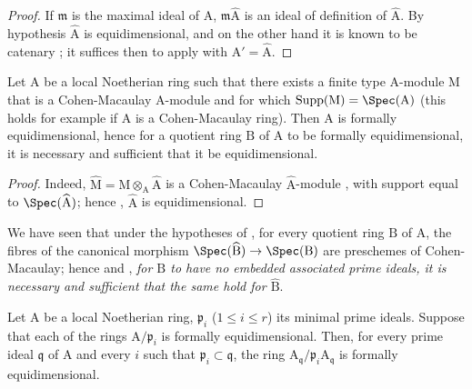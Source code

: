 \begin{proof}
If $\mathfrak{m}$ is the maximal ideal of $\mathrm{A}$, $\mathfrak{m}\widehat{\mathrm{A}}$ is an ideal of definition of $\widehat{\mathrm{A}}$.
By hypothesis $\widehat{\mathrm{A}}$ is equidimensional, and on the other hand it is known to be catenary ; it suffices then to apply  with $\mathrm{A}'=\widehat{\mathrm{A}}$.
\end{proof}

\begin{corollary}[7.1.5]
\label{IV.7.1.5}
Let $\mathrm{A}$ be a local Noetherian ring such that there exists a finite type $\mathrm{A}$-module $\mathrm{M}$ that is a Cohen-Macaulay $\mathrm{A}$-module and for which $\operatorname{Supp}(\mathrm{M})=\Spec(\mathrm{A})$ (this holds for example if $\mathrm{A}$ is a Cohen-Macaulay ring).
Then $\mathrm{A}$ is formally equidimensional, hence  for a quotient ring $\mathrm{B}$ of $\mathrm{A}$ to be formally equidimensional, it is necessary and sufficient that it be equidimensional.
\end{corollary}

\begin{proof}
Indeed, $\widehat{\mathrm{M}}=\mathrm{M}\otimes_\mathrm{A}\widehat{\mathrm{A}}$ is a Cohen-Macaulay $\widehat{\mathrm{A}}$-module , with support equal to $\Spec(\widehat{\mathrm{A}})$; hence , $\widehat{\mathrm{A}}$ is equidimensional.
\end{proof}

\begin{remark}[7.1.6]
\label{IV.7.1.6}
We have seen  that under the hypotheses of , for every quotient ring $\mathrm{B}$ of $\mathrm{A}$, the fibres of the canonical morphism $\Spec(\widehat{\mathrm{B}})\to\Spec(\mathrm{B})$ are preschemes of Cohen-Macaulay; hence  and , \emph{for $\mathrm{B}$ to have no embedded associated prime ideals, it is necessary and sufficient that the same hold for $\widehat{\mathrm{B}}$}.
\end{remark}

\begin{lemma}[7.1.7]
\label{IV.7.1.7}
Let $\mathrm{A}$ be a local Noetherian ring, $\mathfrak{p}_i$ ($1\leqslant i\leqslant r$) its minimal prime ideals.
Suppose that each of the rings $\mathrm{A}/\mathfrak{p}_i$ is formally equidimensional.
Then, for every prime ideal $\mathfrak{q}$ of $\mathrm{A}$ and every $i$ such that $\mathfrak{p}_i\subset\mathfrak{q}$, the ring $\mathrm{A}_\mathfrak{q}/\mathfrak{p}_i\mathrm{A}_\mathfrak{q}$ is formally equidimensional.
\end{lemma}

